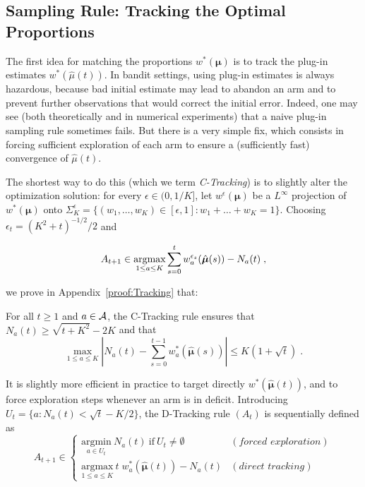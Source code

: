 \documentclass{colt2016} %
\begin{document}
\subsection{Sampling Rule: Tracking the Optimal Proportions}
\label{subsec:Sampling}
The first idea for matching the proportions $w^*(\bm \mu)$ is to track the plug-in estimates $w^*(\hat{\mu}(t))$. In bandit settings, using plug-in estimates is always hazardous, because bad initial estimate may lead to abandon an arm and to prevent further observations that would correct the initial error. Indeed, one may see (both theoretically and in numerical experiments) that a naive plug-in sampling rule sometimes fails. But there is a very simple fix, which consists in forcing sufficient exploration of each arm to ensure a (sufficiently fast) convergence of $\hat{\mu}(t)$. 

The shortest way to do this (which we term \emph{C-Tracking}) is to slightly alter the optimization solution: for every $\epsilon\in(0,1/K]$, let $w^\epsilon(\bm \mu)$ be a $L^\infty$ projection of $w^*(\bm \mu)$ onto $ \Sigma^\epsilon_K=\big\{(w_1,\dots,w_K)\in [\epsilon, 1] : w_1+\dots+w_K=1\big\}$.
Choosing $\epsilon_t = (K^2+t)^{-1/2}/2$ and 

\vspace{-0.4cm}\[A_{t+1} \in \underset{1\leq a\leq K}{\text{argmax}} \sum_{s=0}^{t} w^{\epsilon_s}_a(\hat{\bm\mu}(s)) - {N_a}(t)\;,\]

\vspace{-0.3cm}\noindent we prove in Appendix~\ref{proof:Tracking} that: 
\begin{lemma}\label{lem:TrackingC}
For all $t\geq 1$ and $a\in\mathcal{A}$, the C-Tracking rule ensures that $N_a(t)\geq\sqrt{t+K^2}-2K$ and that
\[\max_{1\leq a\leq K} \left|N_a(t) - \sum_{s=0}^{t-1} w^*_a(\hat{\bm \mu}(s))\right| \leq K (1+\sqrt{t}) \;.\]
\end{lemma}
It is slightly more efficient in practice to target directly $w^*(\hat{\bm \mu}(t))$, and to force exploration steps whenever an arm is in deficit. Introducing $U_t = \{ a : N_a(t) < \sqrt{t} - K/2\}$, the D-Tracking rule $(A_t)$ is sequentially defined as
\[A_{t+1} \in \left\{\begin{array}{ll}
                    \underset{a \in U_t}{\text{argmin}}  \ N_a(t) \ \text{if} \ U_t \neq \emptyset & (\textit{forced  exploration})\\
                    \underset{1 \leq a \leq K}{\text{argmax}} \ t \;w_a^*(\hat{\bm\mu}(t)) -{N_a}(t) & (\textit{direct tracking})
                   \end{array}
\right.\]
\end{document}
